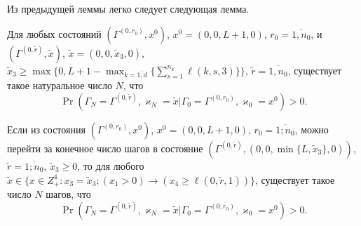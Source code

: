 \documentclass[a4paper,12pt,russian]{extarticle}
\begin{document}
Из предыдущей леммы легко следует следующая лемма.
\begin{lemma}
Для любых состояний $(\Gamma^{(0,r_0)},x^0)$, $x^0=(0,0,L+1,0)$,  $r_0=\overline{1,n_0}$, и
$(\Gamma^{(0,\tilde{r})},\tilde{x})$,
$\tilde{x}=(0,0,\tilde{x}_3,0)$, $\tilde{x}_3\geqslant \max{\{0,L+1-\max_{k=\overline{1,d}}{\{ \sum_{s=1}^{n_k}\ell(k,s,3)\}}\}}$,
$\tilde{r} = \overline{1,n_0}$, существует такое натуральное число $N$, что 
\begin{equation*}
\Pr(\Gamma_{N}=\Gamma^{(0,\tilde{r} )}, \varkappa_{N}=\tilde{x}|
\Gamma_{0}=\Gamma^{(0,r_0)}, \varkappa_{0}=x^0)>0.
\end{equation*}
\end{lemma}

\begin{lemma}
Если из состояния $(\Gamma^{(0,r_0)},x^0)$, $x^0=(0,0,L+1,0)$, $r_0=\overline{1;n_0}$, можно перейти за конечное число шагов в состояние $(\Gamma^{(0,\tilde{r})},(0,0,\min\{L,\tilde{x}_3\},0))$, $\tilde{r}=\overline{1;n_0}$, $\tilde{x}_3\geqslant 0$, то для любого $\tilde{x}\in \{x \in Z_+^4\colon x_3=\tilde{x}_3; (x_1 > 0)\rightarrow (x_4\geqslant \ell(0,\tilde{r},1))\}$, существует такое число $N$ шагов, что
\begin{equation*}
\Pr(\Gamma_{N}=\Gamma^{(0,\tilde{r} )}, \varkappa_{N}=\tilde{x}|
\Gamma_{0}=\Gamma^{(0,r_0)}, \varkappa_{0}=x^0)>0.
\end{equation*}
\end{lemma}
\end{document}
